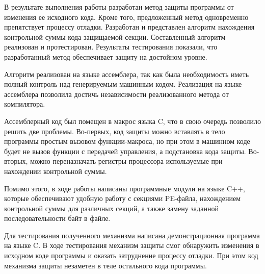 
В результате выполнения работы разработан метод защиты программы от
изменения ее исходного кода.  Кроме того, предложенный метод одновременно
препятствует процессу отладки. Разработан и представлен алгоритм нахождения
контрольной суммы кода защищаемой секции. Составленный алгоритм реализован и
протестирован.  Результаты тестирования показали, что разработанный метод
обеспечивает защиту на достойном уровне.

Алгоритм реализован на языке ассемблера, так как была необходимость иметь
полный контроль над генерируемым машинным кодом. Реализация на языке ассемблера
позволила достичь независимости реализованного метода от компилятора.

Ассемблерный код был помещен в макрос языка C, что в свою очередь позволило
решить две проблемы. Во-первых, код защиты можно вставлять в тело программы
простым вызовом функции-макроса, но при этом в машинном коде будет не вызов
функции с передачей управления, а подстановка кода защиты. Во-вторых, можно
переназначать регистры процессора используемые при нахождении контрольной суммы.

Помимо этого, в ходе работы написаны программные модули на языке C++,
которые обеспечивают удобную работу с секциями PE-файла, нахождением контрольной
суммы для различных секций, а также замену заданной последовательности байт в
файле. 

Для тестирования полученного механизма написана демонстрационная программа на
языке C. В ходе тестирования механизм защиты смог обнаружить изменения в
исходном коде программы и оказать затруднение процессу отладки. При этом код
механизма защиты незаметен в теле остального кода программы.

